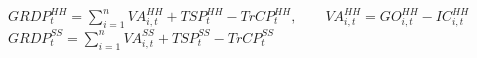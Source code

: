 \documentclass[border=4pt]{standalone}
\begin{document}
\color{black}
\begin{minipage}{17cm}
\centering
\Large $\displaystyle GRDP_t^{HH}=\sum_{i=1}^{n}VA_{i,t}^{HH}+TSP_t^{HH}-TrCP_t^{HH},\qquad VA_{i,t}^{HH}=GO_{i,t}^{HH}-IC_{i,t}^{HH}$\\[5pt]
\normalsize $\displaystyle GRDP_t^{SS}=\sum_{i=1}^{n}VA_{i,t}^{SS}+TSP_t^{SS}-TrCP_t^{SS}$
\end{minipage}
\end{document}

